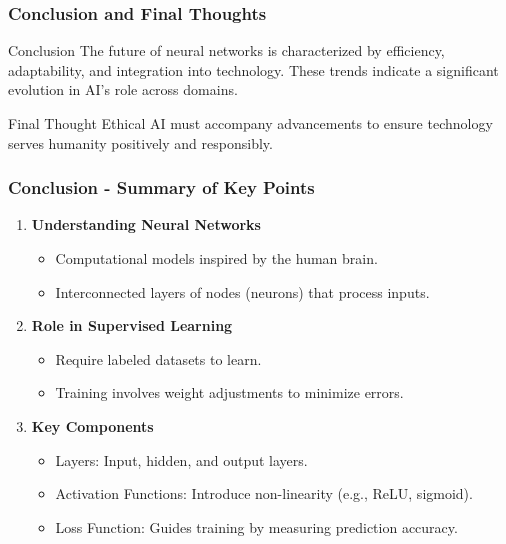 \documentclass[aspectratio=169]{beamer}
\begin{document}
\begin{frame}[fragile]
  \frametitle{Conclusion and Final Thoughts}
  \begin{block}{Conclusion}
    The future of neural networks is characterized by efficiency, adaptability, and integration into technology. These trends indicate a significant evolution in AI's role across domains.
  \end{block}

  \begin{block}{Final Thought}
    Ethical AI must accompany advancements to ensure technology serves humanity positively and responsibly.
  \end{block}
\end{frame}

\begin{frame}[fragile]
  \frametitle{Conclusion - Summary of Key Points}
  \begin{enumerate}
    \item \textbf{Understanding Neural Networks}
    \begin{itemize}
      \item Computational models inspired by the human brain.
      \item Interconnected layers of nodes (neurons) that process inputs.
    \end{itemize}
    
    \item \textbf{Role in Supervised Learning}
    \begin{itemize}
      \item Require labeled datasets to learn.
      \item Training involves weight adjustments to minimize errors.
    \end{itemize}
  
    \item \textbf{Key Components}
    \begin{itemize}
      \item Layers: Input, hidden, and output layers.
      \item Activation Functions: Introduce non-linearity (e.g., ReLU, sigmoid).
      \item Loss Function: Guides training by measuring prediction accuracy.
    \end{itemize}
  \end{enumerate}
\end{frame}
\end{document}

